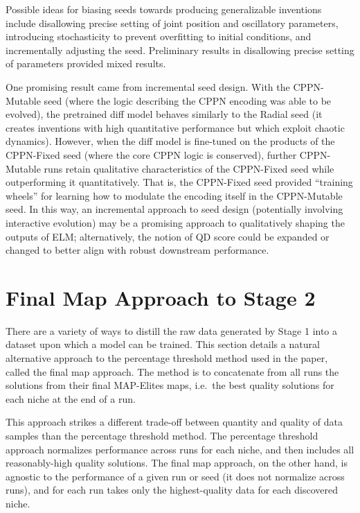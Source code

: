 \documentclass{article}
\begin{document}
Possible ideas for biasing seeds towards producing generalizable
inventions include disallowing precise setting of joint position and
oscillatory parameters, introducing stochasticity to prevent overfitting to initial
conditions, and incrementally adjusting the seed.
Preliminary results in disallowing precise setting of parameters provided mixed results.

One promising result came from incremental seed design.
With the CPPN-Mutable seed (where the logic describing the CPPN encoding was able to
be evolved), the pretrained diff model behaves similarly to the Radial
seed (it creates inventions with high quantitative performance but which exploit 
chaotic dynamics). However, when the diff model is fine-tuned on the products of the
CPPN-Fixed seed (where the core CPPN logic is conserved), further
CPPN-Mutable runs retain qualitative characteristics of the CPPN-Fixed
seed while outperforming it quantitatively. That is, the CPPN-Fixed seed provided
``training wheels'' for learning how to modulate the encoding itself in the CPPN-Mutable seed.
In this way, an incremental
approach to seed design (potentially involving interactive evolution) may be a promising approach to qualitatively
shaping the outputs of ELM; alternatively, the notion of QD score
could be expanded or changed to better align with robust downstream performance.

\section{Final Map Approach to Stage 2}
\label{appendix:finalmap}

There are a variety of ways to distill the raw data generated by Stage 1 into
a dataset upon which a model can be trained. This section details a natural
alternative approach to the percentage threshold method used in the paper, called the final 
map approach. The method is to concatenate from all runs the solutions from
their final MAP-Elites maps, i.e.\ the best quality solutions for each niche
at the end of a run. 

This approach strikes a different trade-off between quantity and quality of
data samples than the percentage threshold method. The percentage threshold
approach normalizes performance across runs for each niche, and then includes
all reasonably-high quality solutions. The final map approach, on the other hand,
is agnostic to the performance of a
given run or seed (it does not normalize across runs), and for each run takes only the highest-quality data
for each discovered niche.
 
\end{document}
